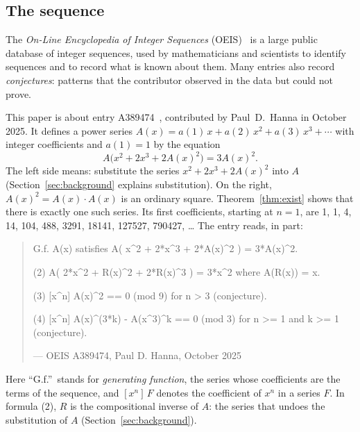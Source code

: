 \documentclass[11pt,a4paper]{article}
\theoremstyle{definition}
\theoremstyle{remark}
\begin{document}
\subsection{The sequence}\label{sec:sequence}
The \emph{On-Line Encyclopedia of Integer Sequences} (OEIS)~\cite{oeisdb} is a large public database of integer
sequences, used by mathematicians and scientists to identify sequences and to record what is known about them. Many
entries also record \emph{conjectures}: patterns that the contributor observed in the data but could not prove.

This paper is about entry A389474~\cite{oeis}, contributed by Paul~D.~Hanna in October 2025. It defines a power series
$A(x)=a(1)\,x+a(2)\,x^2+a(3)\,x^3+\cdots$ with integer coefficients and $a(1)=1$ by the equation
\begin{equation}\label{eq:oeis}
A\bigl(x^2+2x^3+2A(x)^2\bigr)=3A(x)^2 .
\end{equation}
The left side means: substitute the series $x^2+2x^3+2A(x)^2$ into $A$ (Section~\ref{sec:background} explains
substitution). On the right, $A(x)^2=A(x)\cdot A(x)$ is an ordinary square. Theorem~\ref{thm:exist} shows that there
is exactly one such series. Its first coefficients, starting at $n=1$, are 1, 1, 4, 14, 104, 488, 3291, 18141, 127527, 790427, \dots{}
The entry reads, in part:
\begin{quote}\small\ttfamily\raggedright G.f. A(x) satisfies A( x\^{}2 + 2*x\^{}3 + 2*A(x)\^{}2 ) = 3*A(x)\^{}2.\par\smallskip (2) A( 2*x\^{}2 + R(x)\^{}2 + 2*R(x)\^{}3 ) = 3*x\^{}2 where A(R(x)) = x.\par\smallskip (3) [x\^{}n] A(x)\^{}2 == 0 (mod 9) for n > 3 (conjecture).\par\smallskip (4) [x\^{}n] A(x)\^{}(3*k) - A(x\^{}3)\^{}k == 0 (mod 3) for n >= 1 and k >= 1 (conjecture).\par\smallskip\hfill\textrm{--- OEIS A389474, Paul D. Hanna, October 2025}\end{quote}

Here ``G.f.''\ stands for \emph{generating function}, the series whose coefficients are the terms of the sequence, and
$[x^n]\,F$ denotes the coefficient of $x^n$ in a series $F$. In formula (2), $R$ is the compositional inverse of $A$:
the series that undoes the substitution of $A$ (Section~\ref{sec:background}).
\end{document}
